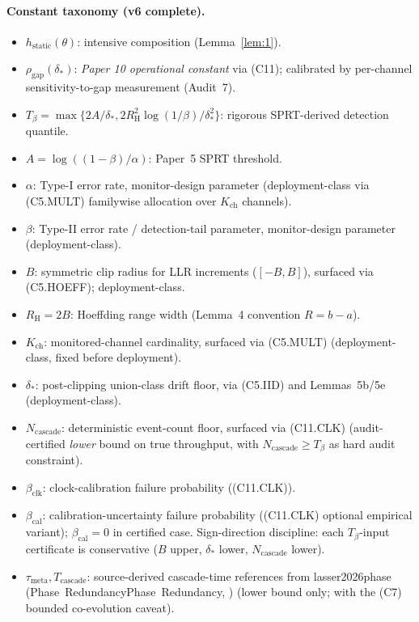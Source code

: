 \documentclass{article}
\makeatletter
\newcommand{\citep}[2][]{%
  \begingroup
  \def\@tmpkey{#2}%
  \ifx\@tmpkey\@empty\else
    (\ifx\@empty#1\@empty\else #1, \fi
     \@nameuse{bibkey@\@tmpkey})%
  \fi
  \endgroup
}
\newcommand{\deltastar}{\delta_{*}}
\newcommand{\rhogap}{\rho_{\mathrm{gap}}}
\newcommand{\Tbeta}{T_{\beta}}
\newcommand{\Ncasc}{N_{\mathrm{cascade}}}
\newcommand{\bclk}{\beta_{\mathrm{clk}}}
\newcommand{\bcal}{\beta_{\mathrm{cal}}}
\newcommand{\Bclip}{B}
\newcommand{\Rh}{R_{\mathrm{H}}}
\newcommand{\Kch}{K_{\mathrm{ch}}}
\makeatother
\begin{document}
\paragraph{Constant taxonomy (v6 complete).}
\begin{itemize}
\item $h_{\mathrm{static}}(\theta)$: intensive composition
  (Lemma~\ref{lem:1}).
\item $\rhogap(\deltastar)$: \emph{Paper 10 operational constant}
  via (C11); calibrated by per-channel sensitivity-to-gap
  measurement (Audit~7).
\item $\Tbeta = \max\{2A/\deltastar, 2\Rh^2\log(1/\beta)/\deltastar^2\}$:
  rigorous SPRT-derived detection quantile.
\item $A = \log((1-\beta)/\alpha)$: Paper~5 SPRT threshold.
\item $\alpha$: Type-I error rate, monitor-design parameter
  (deployment-class via (C5.MULT) familywise allocation over $\Kch$
  channels).
\item $\beta$: Type-II error rate / detection-tail parameter,
  monitor-design parameter (deployment-class).
\item $\Bclip$: symmetric clip radius for LLR increments
  ($[-\Bclip, \Bclip]$), surfaced via (C5.HOEFF); deployment-class.
\item $\Rh = 2\Bclip$: Hoeffding range width (Lemma~4 convention
  $R = b - a$).
\item $\Kch$: monitored-channel cardinality, surfaced via
  (C5.MULT) (deployment-class, fixed before deployment).
\item $\deltastar$: post-clipping union-class drift floor, via
  (C5.IID) and Lemmas~5b/5e (deployment-class).
\item $\Ncasc$: deterministic event-count floor, surfaced via
  (C11.CLK) (audit-certified \emph{lower} bound on true throughput,
  with $\Ncasc \geq \Tbeta$ as hard audit constraint).
\item $\bclk$: clock-calibration failure probability ((C11.CLK)).
\item $\bcal$: calibration-uncertainty failure probability
  ((C11.CLK) optional empirical variant); $\bcal = 0$ in certified
  case.  Sign-direction discipline: each $\Tbeta$-input certificate
  is conservative ($\Bclip$ upper, $\deltastar$ lower, $\Ncasc$
  lower).
\item $\tau_{\mathrm{meta}}, T_{\mathrm{cascade}}$: source-derived
  cascade-time references from
  \citep[Phase~Redundancy]{lasser2026phase} (lower bound only;
  with the (C7) bounded co-evolution caveat).
\end{itemize}
\end{document}
